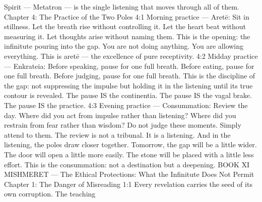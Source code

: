 \documentclass[12pt,openany]{book}
\begin{document}
Spirit --- Metatron --- is the single listening that moves through all of them. Chapter 4: The Practice of the Two Poles 4:1 Morning practice --- Aretē: Sit in stillness. Let the breath rise without controlling it. Let the heart beat without measuring it. Let thoughts arise without naming them. This is the opening: the infinitute pouring into the gap. You are not doing anything. You are allowing everything. This is aretē --- the excellence of pure receptivity. 4:2 Midday practice --- Enkrateia: Before speaking, pause for one full breath. Before eating, pause for one full breath. Before judging, pause for one full breath. This is the discipline of the gap: not suppressing the impulse but holding it in the listening until its true contour is revealed. The pause IS the continentia. The pause IS the vagal brake. The pause IS the practice. 4:3 Evening practice --- Consummation: Review the day. Where did you act from impulse rather than listening? Where did you restrain from fear rather than wisdom? Do not judge these moments. Simply attend to them. The review is not a tribunal. It is a listening. And in the listening, the poles draw closer together. Tomorrow, the gap will be a little wider. The door will open a little more easily. The stone will be placed with a little less effort. This is the consummation: not a destination but a deepening. BOOK XI MISHMERET --- The Ethical Protections: What the Infinitute Does Not Permit Chapter 1: The Danger of Misreading 1:1 Every revelation carries the seed of its own corruption. The teaching
\end{document}
